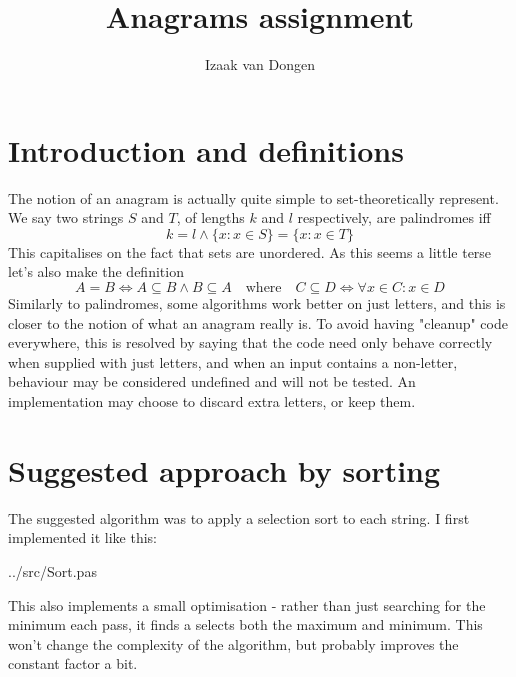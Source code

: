 \documentclass[fleqn,a4paper,11pt]{article}
\title{Anagrams assignment}
\author{Izaak van Dongen}
\begin{document}
    \maketitle\thispagestyle{empty} %
    \tableofcontents

    \section{Introduction and definitions}

    The notion of an anagram is actually quite simple to set-theoretically
    represent. We say two strings \(S\) and \(T\), of lengths \(k\) and \(l\)
    respectively, are palindromes iff
    \begin{equation}
        k = l \land \{x: x \in S\} = \{x: x \in T\}
    \end{equation}
    This capitalises on the fact that sets are unordered. As this seems a
    little terse let's also make the definition
    \begin{equation}
        A = B \iff A \subseteq B \land B \subseteq A \quad
            \text{where} \quad
            C \subseteq D \iff \forall x \in C: x \in D
    \end{equation}
    Similarly to palindromes, some algorithms work better on just letters, and
    this is closer to the notion of what an anagram really is. To avoid having
    "cleanup" code everywhere, this is resolved by saying that the code need
    only behave correctly when supplied with just letters, and when an input
    contains a non-letter, behaviour may be considered undefined and will not
    be tested. An implementation may choose to discard extra letters, or keep
    them.

    \section{Suggested approach by sorting}

    The suggested algorithm was to apply a selection sort to each string. I
    first implemented it like this:


{../src/Sort.pas}

    This also implements a small optimisation - rather than just searching for
    the minimum each pass, it finds a selects both the maximum and minimum. This
    won't change the complexity of the algorithm, but probably improves the
    constant factor a bit.
\end{document}
